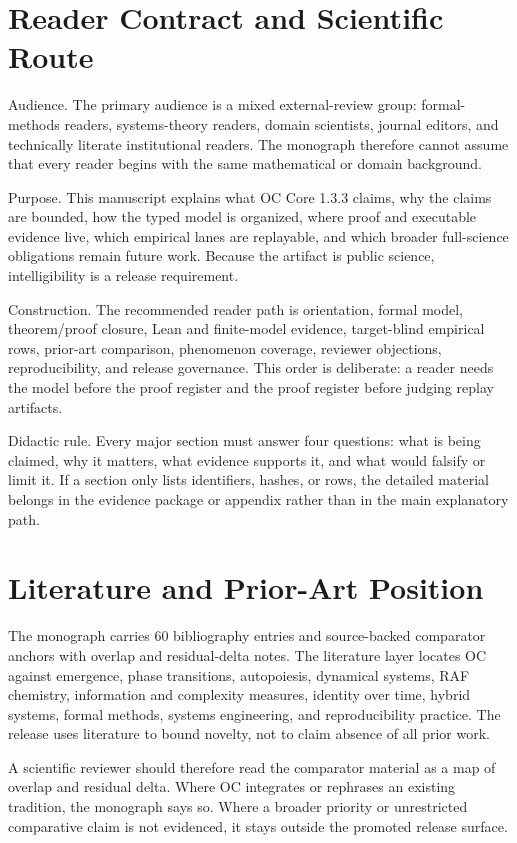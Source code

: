 \section{Reader Contract and Scientific Route}
\label{sec:oc133-reader-contract-scientific-route}
Audience. The primary audience is a mixed external-review group: formal-methods readers, systems-theory readers, domain scientists, journal editors, and technically literate institutional readers. The monograph therefore cannot assume that every reader begins with the same mathematical or domain background.

Purpose. This manuscript explains what OC Core 1.3.3 claims, why the claims are bounded, how the typed model is organized, where proof and executable evidence live, which empirical lanes are replayable, and which broader full-science obligations remain future work. Because the artifact is public science, intelligibility is a release requirement.

Construction. The recommended reader path is orientation, formal model, theorem/proof closure, Lean and finite-model evidence, target-blind empirical rows, prior-art comparison, phenomenon coverage, reviewer objections, reproducibility, and release governance. This order is deliberate: a reader needs the model before the proof register and the proof register before judging replay artifacts.

Didactic rule. Every major section must answer four questions: what is being claimed, why it matters, what evidence supports it, and what would falsify or limit it. If a section only lists identifiers, hashes, or rows, the detailed material belongs in the evidence package or appendix rather than in the main explanatory path.


\section{Literature and Prior-Art Position}
\label{sec:oc133-literature-prior-art-position}
The monograph carries 60 bibliography entries and source-backed comparator anchors with overlap and residual-delta notes. The literature layer locates OC against emergence, phase transitions, autopoiesis, dynamical systems, RAF chemistry, information and complexity measures, identity over time, hybrid systems, formal methods, systems engineering, and reproducibility practice. The release uses literature to bound novelty, not to claim absence of all prior work.

A scientific reviewer should therefore read the comparator material as a map of overlap and residual delta. Where OC integrates or rephrases an existing tradition, the monograph says so. Where a broader priority or unrestricted comparative claim is not evidenced, it stays outside the promoted release surface.


